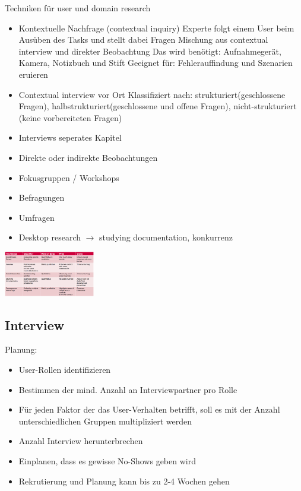 \documentclass{report}
\newenvironment{Figure}
	{\par\medskip\noindent\minipage{\linewidth}}
	{\endminipage\par\medskip}
\theoremstyle{definition}
\theoremstyle{example}
\begin{document}
Techniken für user und domain research
\begin{itemize}
   \item Kontextuelle Nachfrage (contextual inquiry)
   \subitem Experte folgt einem User beim Ausüben des Tasks und stellt dabei Fragen
   \subitem Mischung aus contextual interview und direkter Beobachtung
   \subitem Das wird benötigt: Aufnahmegerät, Kamera, Notizbuch und Stift
   \subitem Geeignet für: Fehlerauffindung und Szenarien eruieren
   \item Contextual interview
   \subitem vor Ort 
   \subitem Klassifiziert nach: strukturiert(geschlossene Fragen), halbstrukturiert(geschlossene und offene Fragen), nicht-strukturiert (keine vorbereiteten Fragen) 
   \item Interviews
   \subitem seperates Kapitel 
   \item Direkte oder indirekte Beobachtungen
   \item Fokusgruppen / Workshops
   \item Befragungen 
   \item Umfragen
   \item Desktop research $\rightarrow$ studying documentation, konkurrenz
\end{itemize}

\begin{Figure}
   \centering
    \includegraphics[width=150px]{img/OverviewTechniques.png}
        \label{fig:Übersicht der Techniken}
\end{Figure}

\subsection{Interview}
Planung:
\begin{itemize}
   \item User-Rollen identifizieren
   \item Bestimmen der mind. Anzahl an Interviewpartner pro Rolle
   \item Für jeden Faktor der das User-Verhalten betrifft, soll es mit der Anzahl unterschiedlichen Gruppen multipliziert werden
   \item Anzahl Interview herunterbrechen
   \item Einplanen, dass es gewisse No-Shows geben wird
   \item Rekrutierung und Planung kann bis zu 2-4 Wochen gehen
\end{itemize}
\end{document}
